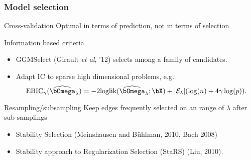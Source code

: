 \begin{frame}
  \frametitle{Model selection}

  \begin{block}{Cross-validation}
    Optimal in terms of \alert{prediction}, not in terms of selection
  \end{block}

  \begin{block}{Information based criteria}
    \begin{itemize}
    \item GGMSelect (Girault \textit{et al}, '12) selects among a family of candidates.
    \item Adapt IC to sparse high dimensional problems, e.g.
    \begin{equation*}
      \text{EBIC}_\gamma(\widehat{{\boldsymbol\invcov}}_\lambda)  =   -2 \textrm{loglik}
      (\widehat{{\boldsymbol\invcov}}_\lambda;\bX) + |\mathcal{E}_\lambda| (\log(n) + 4 \gamma \log(p) ).
    \end{equation*}
    \end{itemize}
  \end{block}

  \begin{block}{Resampling/subsampling}
    \alert{Keep edges frequently selected} on an range of $\lambda$ after sub-samplings
    \begin{itemize}
    \item Stability Selection (Meinshausen and B\"uhlman, 2010, Bach 2008)
    \item Stability approach to Regularization Selection (StaRS) (Liu, 2010).
    \end{itemize}
  \end{block}
\end{frame}




